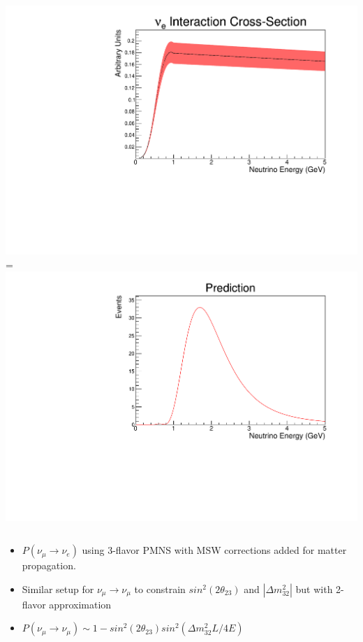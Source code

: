 \documentclass[9pt, aspectratio=169]{beamer}
\begin{document}
\begin{frame}
\begin{columns}
    \hfill *
    \includegraphics[scale=0.185]{figures_final/xsec.pdf}
    \hfill = 
    \includegraphics[scale=0.185]{figures_final/pred.pdf}
  \end{columns}
  \bigskip
  \begin{itemize}
    \item $P(\nu_{\mu} \rightarrow \nu_{e})$ using 3-flavor PMNS with MSW corrections added for matter propagation.
    \item Similar setup for $\nu_{\mu} \rightarrow \nu_{\mu}$ to constrain $sin^{2}(2\theta_{23})$ and $|\Delta m^2_{32}|$ but with 2-flavor approximation
    \item $P(\nu_{\mu} \rightarrow \nu_{\mu}) \sim 1 - sin^{2}(2\theta_{23})sin^{2}(\Delta m^2_{32}L/4E)$ 
  \end{itemize}
\end{frame}
\end{document}
